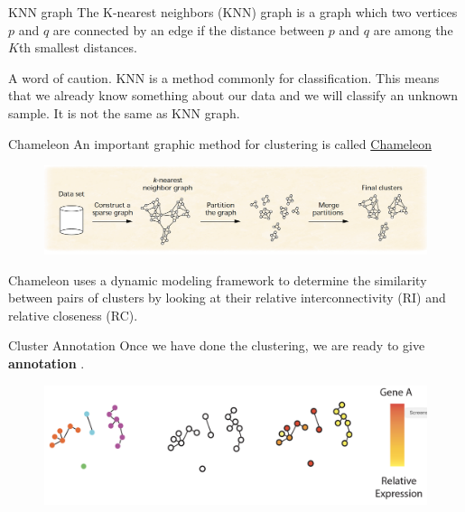 \documentclass{beamer}
\begin{document}
\begin{frame}{KNN graph}
	The K-nearest neighbors (KNN) graph is a graph which two vertices $p$ and $q$ are connected by an edge if the distance between $p$ and $q$ are among the $K$th smallest distances.
	
	A word of caution. KNN is a method commonly for classification. This means that we already know something about our data and we will classify an unknown sample. It is not the same as KNN graph.
	
	
\end{frame}

\begin{frame}{Chameleon}
	An important graphic method for clustering is called \href{https://doi.org/10.1109/2.781637}{Chameleon}

				\begin{figure}[h]
	\centering
	\includegraphics[scale=0.3]{../../Figures/chameleon.png}
\end{figure}	
Chameleon uses a dynamic modeling framework to
determine the similarity between pairs of clusters by looking
at their relative interconnectivity (RI) and relative
closeness (RC).
	
\end{frame}

\begin{frame}{Cluster Annotation}
	Once we have done the clustering, we are ready to give {\bf annotation} . 
	 
				\begin{figure}[h]
	\centering
	\includegraphics[scale=0.3]{../../Figures/sc_annotation.png}
\end{figure}		
	
\end{frame}
	
\end{document}
